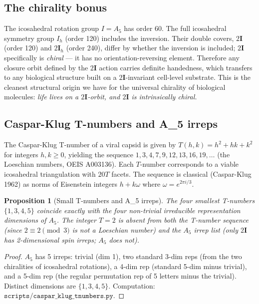 \documentclass[12pt]{article}
\newtheorem{proposition}[theorem]{Proposition}
\newcommand{\twoI}{2\mathbf{I}}
\begin{document}
\subsection{The chirality bonus}\label{sec:bio:chirality}

The icosahedral rotation group $I = A_5$ has order 60. The full icosahedral symmetry group $I_h$ (order 120) includes the inversion. Their double covers, $\twoI$ (order 120) and $\twoI_h$ (order 240), differ by whether the inversion is included; $\twoI$ specifically is \emph{chiral} --- it has no orientation-reversing element. Therefore any closure orbit defined by the $\twoI$ action carries definite handedness, which transfers to any biological structure built on a $\twoI$-invariant cell-level substrate. This is the cleanest structural origin we have for the universal chirality of biological molecules: \emph{life lives on a $\twoI$-orbit, and $\twoI$ is intrinsically chiral.}

\subsection{Caspar-Klug T-numbers and A\_5 irreps}\label{sec:bio:tnumbers}

The Caspar-Klug T-number of a viral capsid is given by $T(h, k) = h^2 + hk + k^2$ for integers $h, k \geq 0$, yielding the sequence $1, 3, 4, 7, 9, 12, 13, 16, 19, \ldots$ (the Loeschian numbers, OEIS A003136). Each $T$-number corresponds to a viable icosahedral triangulation with $20T$ facets. The sequence is classical (Caspar-Klug 1962) as norms of Eisenstein integers $h + k\omega$ where $\omega = e^{2\pi i/3}$.

\begin{proposition}[Small T-numbers and A\_5 irreps]\label{prop:tnumbers}
The four smallest T-numbers $\{1, 3, 4, 5\}$ coincide exactly with the four non-trivial irreducible representation dimensions of $A_5$. The integer $T = 2$ is absent from both the T-number sequence (since $2 \equiv 2 \pmod 3$ is not a Loeschian number) and the $A_5$ irrep list (only $\twoI$ has 2-dimensional spin irreps; $A_5$ does not).
\end{proposition}

\begin{proof}
$A_5$ has 5 irreps: trivial (dim 1), two standard 3-dim reps (from the two chiralities of icosahedral rotations), a 4-dim rep (standard 5-dim minus trivial), and a 5-dim rep (the regular permutation rep of 5 letters minus the trivial). Distinct dimensions are $\{1, 3, 4, 5\}$. Computation: $\texttt{scripts/caspar\_klug\_tnumbers.py}$.
\end{proof}
\end{document}

